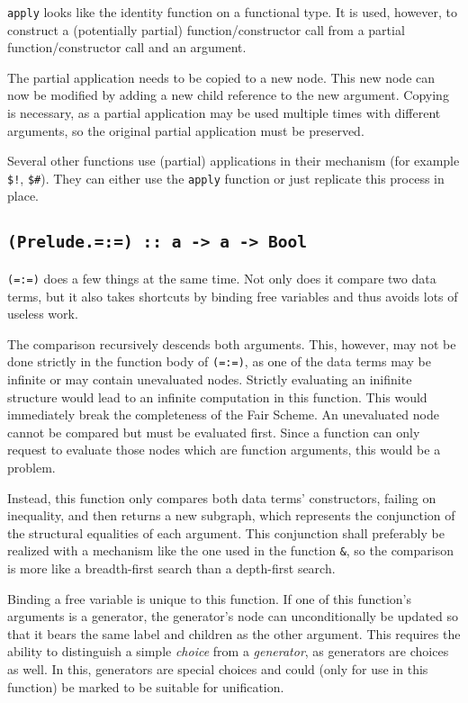 \texttt{apply} looks like the identity function on a functional type.
It is used, however, to construct a (potentially partial) function/constructor call from a partial function/constructor call and an argument.

The partial application needs to be copied to a new node.
This new node can now be modified by adding a new child reference to the new argument.
Copying is necessary, as a partial application may be used multiple times with different arguments, so the original partial application must be preserved.

Several other functions use (partial) applications in their mechanism (for example \texttt{\$!}, \texttt{\$\#}).
They can either use the \texttt{apply} function or just replicate this process in place.

\subsection{\texttt{(Prelude.=:=) ::~a -> a -> Bool}}

\texttt{(=:=)} does a few things at the same time.
Not only does it compare two data terms, but it also takes shortcuts by binding free variables and thus avoids lots of useless work.

The comparison recursively descends both arguments.
This, however, may not be done strictly in the function body of \texttt{(=:=)}, as one of the data terms may be infinite or may contain unevaluated nodes.
Strictly evaluating an inifinite structure would lead to an infinite computation in this function.
This would immediately break the completeness of the Fair Scheme.
An unevaluated node cannot be compared but must be evaluated first.
Since a function can only request to evaluate those nodes which are function arguments, this would be a problem.

Instead, this function only compares both data terms' constructors, failing on inequality, and then returns a new subgraph, which represents the conjunction of the structural equalities of each argument.
This conjunction shall preferably be realized with a mechanism like the one used in the function \texttt{\&}, so the comparison is more like a breadth-first search than a depth-first search.

Binding a free variable is unique to this function.
If one of this function's arguments is a generator, the generator's node can unconditionally be updated so that it bears the same label and children as the other argument.
This requires the ability to distinguish a simple \emph{choice} from a \emph{generator}, as generators are choices as well.
In this, generators are special choices and could (only for use in this function) be marked to be suitable for unification.


